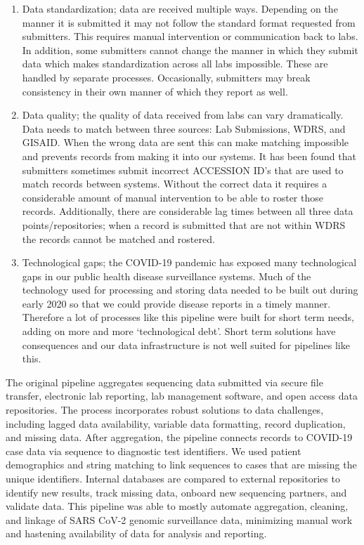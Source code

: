 \documentclass[
]{agujournal2019}
\providecommand{\tightlist}{%
  \setlength{\itemsep}{0pt}\setlength{\parskip}{0pt}}\usepackage{longtable,booktabs,array}
\begin{document}
\begin{enumerate}
\def\labelenumi{\arabic{enumi}.}
\tightlist
\item
  Data standardization; data are received multiple ways. Depending on
  the manner it is submitted it may not follow the standard format
  requested from submitters. This requires manual intervention or
  communication back to labs. In addition, some submitters cannot change
  the manner in which they submit data which makes standardization
  across all labs impossible. These are handled by separate processes.
  Occasionally, submitters may break consistency in their own manner of
  which they report as well.
\item
  Data quality; the quality of data received from labs can vary
  dramatically. Data needs to match between three sources: Lab
  Submissions, WDRS, and GISAID. When the wrong data are sent this can
  make matching impossible and prevents records from making it into our
  systems. It has been found that submitters sometimes submit incorrect
  ACCESSION ID's that are used to match records between systems. Without
  the correct data it requires a considerable amount of manual
  intervention to be able to roster those records. Additionally, there
  are considerable lag times between all three data points/repositories;
  when a record is submitted that are not within WDRS the records cannot
  be matched and rostered.
\item
  Technological gaps; the COVID-19 pandemic has exposed many
  technological gaps in our public health disease surveillance systems.
  Much of the technology used for processing and storing data needed to
  be built out during early 2020 so that we could provide disease
  reports in a timely manner. Therefore a lot of processes like this
  pipeline were built for short term needs, adding on more and more
  `technological debt'. Short term solutions have consequences and our
  data infrastructure is not well suited for pipelines like this.
\end{enumerate}

The original pipeline aggregates sequencing data submitted via secure
file transfer, electronic lab reporting, lab management software, and
open access data repositories. The process incorporates robust solutions
to data challenges, including lagged data availability, variable data
formatting, record duplication, and missing data. After aggregation, the
pipeline connects records to COVID-19 case data via sequence to
diagnostic test identifiers. We used patient demographics and string
matching to link sequences to cases that are missing the unique
identifiers. Internal databases are compared to external repositories to
identify new results, track missing data, onboard new sequencing
partners, and validate data. This pipeline was able to mostly automate
aggregation, cleaning, and linkage of SARS CoV-2 genomic surveillance
data, minimizing manual work and hastening availability of data for
analysis and reporting.
\end{document}
